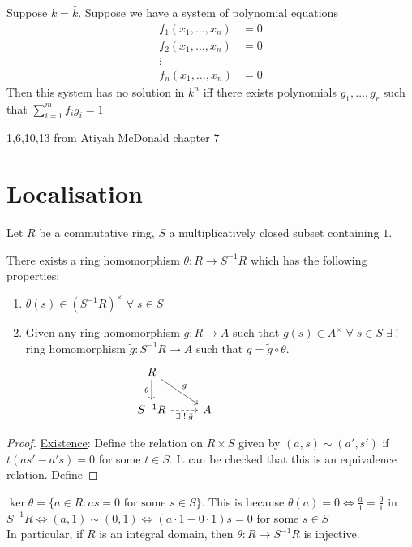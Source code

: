 \documentclass[oneside, 12pt]{scrbook}
\theoremstyle{theorem}
\begin{document}
\begin{corollary}
Suppose $k = \bar{k}$. Suppose we have a system of polynomial equations 
\begin{align*}
f_{1}(x_{1}, \hdots ,x_{n}) &=0 \\
f_{2}(x_{1}, \hdots ,x_{n}) &=0 \\
\vdots \\
f_{n}(x_{1}, \hdots ,x_{n}) &=0
\end{align*}
Then this system has no solution in $k^n$ iff there exists polynomials $g_{1}, \hdots ,g_{r}$ such that $\sum_{i=1}^m f_{i}g_{i} = 1$
\end{corollary}


\begin{exercise}
1,6,10,13 from Atiyah McDonald chapter 7
\end{exercise}


\chapter{Localisation}
Let $R$ be a commutative ring, $S$ a multiplicatively closed subset containing $1$.
\begin{theorem}
There exists a ring homomorphism $\theta : R \rightarrow S^{-1}R$ which has the following properties: 
\begin{enumerate}
\item $\theta(s) \in (S^{-1}R)^{\times} \; \forall \; s\in S$
\item Given any ring homomorphism $g: R \rightarrow A$ such that $g(s) \in A^{\times} \; \forall \; s \in S \; \exists \; ! \;$ ring homomorphism $\tilde{g}: S^{-1}R \rightarrow A$ such that $g = \tilde{g} \circ \theta$.
\[\begin{tikzcd}
	R &&&& {} \\
	{S^{-1}R} & A
	\arrow["\theta"', from=1-1, to=2-1]
	\arrow["g", from=1-1, to=2-2]
	\arrow["{\exists \;!\; \tilde{g}}"', dashed, from=2-1, to=2-2]
\end{tikzcd}\]
\end{enumerate}
\end{theorem}

\begin{proof}
\underline{Existence}: Define the relation on $R \times S$ given by $(a,s) \sim (a',s') $ if $t(as' - a's) =0$ for some $t \in S$. It can be checked that this is an equivalence relation. Define  
\end{proof}

\begin{remark}
$\ker \theta = \{a \in R : as=0 \text{ for some }s \in S\}$. This is because $\theta(a)=0 \Leftrightarrow \frac{a}{1}= \frac{0}{1}$ in $S^{-1}R \Leftrightarrow (a,1) \sim (0,1) \Leftrightarrow (a\cdot 1 - 0 \cdot 1)s=0$ for some $s\in S$\\

In particular, if $R$ is an integral domain, then $\theta : R \rightarrow S^{-1}R$ is injective.
\end{remark}
\end{document}
